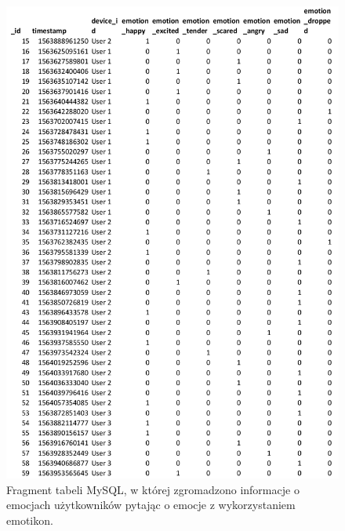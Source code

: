 \begin{figure}[H]
\centering
\includegraphics[scale=0.9]{dodatekB/Emoji.png}
\caption{Fragment tabeli MySQL, w której zgromadzono informacje o emocjach użytkowników pytając o emocje z wykorzystaniem emotikon.}
\end{figure}

